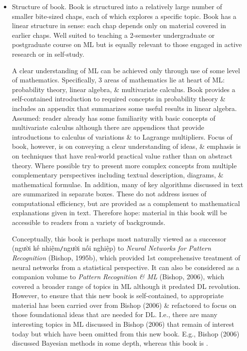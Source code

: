 \documentclass{article}
\begin{document}
\begin{itemize}
	\item {\sf Structure of book.} Book is structured into a relatively large number of smaller bite-sized chaps, each of which explores a specific topic. Book has a linear structure in sense: each chap depends only on material covered in earlier chaps. Well suited to teaching a 2-semester undergraduate or postgraduate course on ML but is equally relevant to those engaged in active research or in self-study.

	A clear understanding of ML can be achieved only through use of some level of mathematics. Specifically, 3 areas of mathematics lie at heart of ML: probability theory, linear algebra, \& multivariate calculus. Book provides a self-contained introduction to required concepts in probability theory \& includes an appendix that summarizes some useful results in linear algebra. Assumed: reader already has some familiarity with basic concepts of multivariate calculus although there are appendices that provide introductions to calculus of variations \& to Lagrange multipliers. Focus of book, however, is on conveying a clear understanding of ideas, \& emphasis is on techniques that have real-world practical value rather than on abstract theory. Where possible try to present more complex concepts from multiple complementary perspectives including textual description, diagrams, \& mathematical formulae. In addition, many of key algorithms discussed in text are summarized in separate boxes. These do not address issues of computational efficiency, but are provided as a complement to mathematical explanations given in text. Therefore hope: material in this book will be accessible to readers from a variety of backgrounds.

	Conceptually, this book is perhaps most naturally viewed as a successor (người kế nhiệm{\tt/}người nối nghiệp) to {\it Neural Networks for Pattern Recognition} (Bishop, 1995b), which provided 1st comprehensive treatment of neural networks from a statistical perspective. It can also be considered as a companion volume to {\it Pattern Recognition \& ML} (Bishop, 2006), which covered a broader range of topics in ML although it predated DL revolution. However, to ensure that this new book is self-contained, to appropriate material has been carried over from Bishop (2006) \& refactored to focus on those foundational ideas that are needed for DL. I.e., there are many interesting topics in ML discussed in Bishop (2006) that remain of interest today but which have been omitted from this new book. E.g., Bishop (2006) discussed Bayesian methods in some depth, whereas this book is .


\end{itemize}
\end{document}
